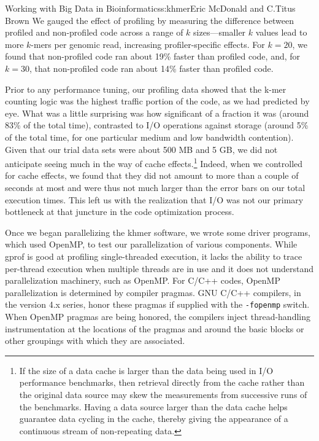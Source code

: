 \begin{aosachapter}{Working with Big Data in Bioinformatics}{s:khmer}{Eric McDonald and C.\/Titus Brown}
We gauged the effect of profiling by measuring the difference between
profiled and non-profiled code across a range of $k$ sizes---smaller $k$
values lead to more $k$-mers per genomic read, increasing
profiler-specific effects. For $k = 20$, we found that non-profiled code
ran about 19\% faster than profiled code, and, for $k = 30$, that
non-profiled code ran about 14\% faster than profiled code.

Prior to any performance tuning, our profiling data showed that the
k-mer counting logic was the highest traffic portion of the code, as we
had predicted by eye. What was a little surprising was how significant
of a fraction it was (around 83\% of the total time), contrasted to I/O
operations against storage (around 5\% of the total time, for one
particular medium and low bandwidth contention). Given that our trial
data sets were about 500 MB and 5 GB, we did not anticipate seeing much
in the way of cache effects.\footnote{If the size of a data cache is
  larger than the data being used in I/O performance benchmarks, then
  retrieval directly from the cache rather than the original data source
  may skew the measurements from successive runs of the benchmarks.
  Having a data source larger than the data cache helps guarantee data
  cycling in the cache, thereby giving the appearance of a continuous
  stream of non-repeating data.} Indeed, when we controlled for cache
effects, we found that they did not amount to more than a couple of
seconds at most and were thus not much larger than the error bars on our
total execution times. This left us with the realization that I/O was
not our primary bottleneck at that juncture in the code optimization
process.

Once we began parallelizing the khmer software, we wrote some driver
programs, which used OpenMP\cite{web:OpenMP}, to test our
parallelization of various components. While gprof is good at profiling
single-threaded execution, it lacks the ability to trace per-thread
execution when multiple threads are in use and it does not understand
parallelization machinery, such as OpenMP. For C/C++ codes, OpenMP
parallelization is determined by compiler pragmas. GNU C/C++ compilers,
in the version 4.x series, honor these pragmas if supplied with the
\texttt{-fopenmp} switch. When OpenMP pragmas are being honored, the
compilers inject thread-handling instrumentation at the locations of the
pragmas and around the basic blocks or other groupings with which they
are associated.


\end{aosachapter}
